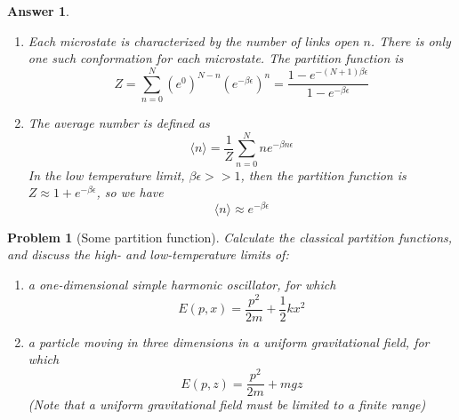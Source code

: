 \documentclass[a4paper]{article}
\newtheorem{ans}{Answer}[section]
\theoremstyle{new}
\newtheorem{qns}{Problem}[section]
\begin{document}
\begin{ans}\leavevmode
\begin{enumerate}[label=(\alph*)]
\item Each microstate is characterized by the number of links open $n$. There is only one such conformation for each microstate. The partition function is
$$Z=\sum_{n=0}^N(e^0)^{N-n}(e^{-\beta\epsilon})^{n}=\frac{1-e^{-(N+1)\beta\epsilon}}{1-e^{-\beta\epsilon}}$$
\item The average number is defined as
$$\langle n\rangle=\frac{1}{Z}\sum_{n=0}^Nne^{-\beta n\epsilon}$$
In the low temperature limit, $\beta\epsilon>>1$, then the partition function is $Z\approx1+e^{-\beta\epsilon}$, so we have
$$\langle n\rangle\approx e^{-\beta\epsilon}$$
\end{enumerate}
\end{ans}
\newpage
\begin{qns}[Some partition function]
Calculate the classical partition functions, and discuss the high- and low-temperature limits of:
\begin{enumerate}[label=(\alph*)]
\item a one-dimensional simple harmonic oscillator, for which
$$E(p,x)=\frac{p^2}{2m}+\frac{1}{2}kx^2$$
\item a particle moving in three dimensions in a uniform gravitational field, for which
$$E(p,z)=\frac{p^2}{2m}+mgz$$
(Note that a uniform gravitational field must be limited to a finite range)
\end{enumerate}
\end{qns}
\end{document}
